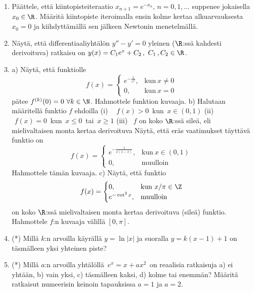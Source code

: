 \begin{enumerate}
\item
Päättele, että kiintopisteiteraatio $x_{n+1}=e^{-x_n},\, n=0,1,\dots$
suppenee jokaisella $x_0\in\R$. Määritä kiintopiste iteroimalla ensin
kolme kertaa alkuarvauksesta $x_0=0$ ja kiihdyttämällä sen jälkeen Newtonin menetelmällä.

\item
Näytä, että differentiaaliyhtälön $y''-y'=0$ yleinen ($\R$:ssä kahdesti derivoituva) ratkaisu on
$y(x)=C_1 e^x +C_2\,,\ C_1\,,C_2\in\R$.

\item
a) Näytä, että funktiolle
\[
f(x) = \begin{cases}
       e^{-\frac{1}{x^2}}, &\text{kun}\ x \neq 0 \\ 0, &\text{kun}\ x=0
       \end{cases}
\]
pätee $f^{(k)}(0)=0\ \forall k\in\N$. Hahmottele funktion kuvaaja. \vspace{1mm}\newline
b) Halutaan määritellä funktio $f$ ehdoilla \vspace{2mm}\newline
(i) \   $\,\ f(x)>0\,$ kun $\,x\in(0,1)$ \newline
(ii)\   $\,\ f(x)=0\,$ kun $\,x \le 0\,$ tai $\,x \ge 1$ \newline
(iii) \ $f$ on koko $\R$:ssä sileä, eli mielivaltaisen monta kertaa derivoituva \vspace{2mm}
\newline
Näytä, että eräs vaatimukset täyttävä funktio on
\[
f(x)=\begin{cases} 
     e^{-\frac{1}{x(1-x)}}, &\text{kun}\ x\in(0,1) \\ 0, &\text{muulloin}
     \end{cases}
\]
Hahmottele tämän kuvaaja. \vspace{1mm}\newline
c) Näytä, että funktio
\[
f(x)=\begin{cases} 
     0,             &\text{kun}\ x/\pi\in\Z \\ e^{-\cot^2 x}, &\text{muulloin}
     \end{cases}
\]
on koko $\R$:ssä mielivaltaisen monta kertaa derivoituva (sileä) funktio. Hahmottele $f$:n
kuvaaja välillä $[0,\pi]$.

\item (*)
Millä $k$:n arvoilla käyrällä $y=\ln|x|$ ja suoralla $y=k(x-1)+1$ on täsmälleen yksi yhteinen
piste?

\item (*)
Millä $a$:n arvoilla yhtälöllä $\,e^x=x+ax^2\,$ on reaalisia ratkaisuja a) ei yhtään, 
b) vain yksi, c) täsmälleen kaksi, d) kolme tai enemmän? Määritä ratkaisut numeerisin keinoin
tapauksissa $a=1$ ja $a=2$.


\end{enumerate}
